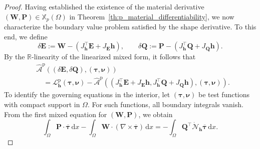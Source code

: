 \documentclass[12pt,reqno]{amsart}
\theoremstyle{definition}
\numberwithin{equation}{section}
\begin{document}
\begin{proof}
Having established the existence of the material derivative $(\mathbf{W}, \mathbf{P}) \in \mathbb{X}_p(\Omega)$ in Theorem~\ref{th:p_material_differentiability}, we now characterize the boundary value problem satisfied by the shape derivative. To this end, we define
\[
\delta\mathbf{E} := \mathbf{W} - \left(J_{\mathbf{h}}^{\top}\mathbf{E} + J_{\mathbf{E}}\mathbf{h}\right), \qquad 
\delta\mathbf{Q} := \mathbf{P} - \left(J_{\mathbf{h}}^{\top}\mathbf{Q} + J_{\mathbf{Q}}\mathbf{h}\right).
\]
By the $\mathbb{R}$-linearity of the linearized mixed form, it follows that
\[
\begin{aligned}
&\widehat{\mathcal{A}}^{\mathrm{p}} ((\delta\mathbf{E}, \delta\mathbf{Q}), (\boldsymbol{\tau}, \boldsymbol{\nu})) \\
&\quad = \mathcal{L}_{\mathbf{h}}^{\mathrm{p}}(\boldsymbol{\tau}, \boldsymbol{\nu}) - \widehat{\mathcal{A}}^{\mathrm{p}} \left( \left( J_{\mathbf{h}}^{\top}\mathbf{E} + J_{\mathbf{E}}\mathbf{h}, J_{\mathbf{h}}^{\top}\mathbf{Q} + J_{\mathbf{Q}}\mathbf{h} \right), (\boldsymbol{\tau}, \boldsymbol{\nu}) \right).
\end{aligned}
\]
To identify the governing equations in the interior, let $(\boldsymbol{\tau}, \boldsymbol{\nu})$ be test functions with compact support in $\Omega$. For such functions, all boundary integrals vanish. From the first mixed equation for $(\mathbf{W}, \mathbf{P})$, we obtain
\[
\int_\Omega \mathbf{P} \cdot \overline{\boldsymbol{\tau}} \,\mathrm{d}x - \int_\Omega \mathbf{W} \cdot (\nabla \times \overline{\boldsymbol{\tau}}) \,\mathrm{d}x = -\int_\Omega \mathbf{Q}^{\top} \dot{\mathcal{N}}_{\mathbf{h}} \overline{\boldsymbol{\tau}} \,\mathrm{d}x.
\]



\end{proof}
\end{document}
